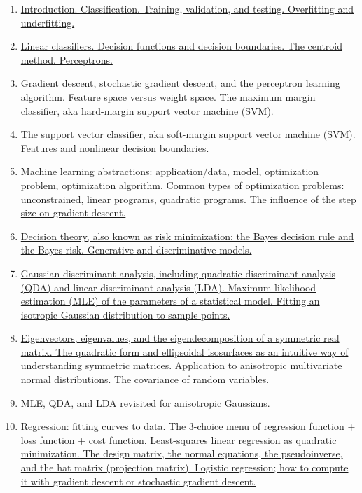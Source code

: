 \documentclass[11pt]{article}
\begin{document}
\begin{enumerate}
	\item  \href{https://mp.weixin.qq.com/s/zLZz3cpvmCjDR2PdJ2qb_g}{Introduction. Classification. Training, validation, and testing. Overfitting and underfitting.} %
	\item  \href{https://mp.weixin.qq.com/s/SGqzoJ22wzwbLHpHSFGSFg}{Linear classifiers. Decision functions and decision boundaries. The centroid method. Perceptrons.} %
	\item  \href{https://mp.weixin.qq.com/s/aFAN-kjJ2YDEHtxrZxP_3g}{Gradient descent, stochastic gradient descent, and the perceptron learning algorithm. Feature space versus weight space. The maximum margin classifier, aka hard-margin support vector machine (SVM).} %
	\item  \href{https://mp.weixin.qq.com/s/a7besi4VC38vRdHASzDtMQ}{The support vector classifier, aka soft-margin support vector machine (SVM). Features and nonlinear decision boundaries.} %
	\item  \href{https://mp.weixin.qq.com/s/EVWSECLifCrTRuo2PwJpxg}{Machine learning abstractions: application/data, model, optimization problem, optimization algorithm. Common types of optimization problems: unconstrained, linear programs, quadratic programs. The influence of the step size on gradient descent.} %
	\item  \href{https://mp.weixin.qq.com/s/RWuGUKQGb7XOVRhLGPobLA}{Decision theory, also known as risk minimization: the Bayes decision rule and the Bayes risk. Generative and discriminative models.} %
	\item  \href{https://mp.weixin.qq.com/s/zi6zvmfnoiLEw0qBEr_Omg}{Gaussian discriminant analysis, including quadratic discriminant analysis (QDA) and linear discriminant analysis (LDA). Maximum likelihood estimation (MLE) of the parameters of a statistical model. Fitting an isotropic Gaussian distribution to sample points.} %
	\item  \href{https://mp.weixin.qq.com/s/itd9chjSjtMfRzDuc_uKvA}{Eigenvectors, eigenvalues, and the eigendecomposition of a symmetric real matrix. The quadratic form and ellipsoidal isosurfaces as an intuitive way of understanding symmetric matrices. Application to anisotropic multivariate normal distributions. The covariance of random variables.} %
	\item  \href{https://mp.weixin.qq.com/s/SSjJQtt7FR7h0JBINyp1zA}{MLE, QDA, and LDA revisited for anisotropic Gaussians.} %
	\item  \href{https://mp.weixin.qq.com/s/A1pVIIu3EWW8Spr6LYO_Jw}{Regression: fitting curves to data. The 3-choice menu of regression function + loss function + cost function. Least-squares linear regression as quadratic minimization. The design matrix, the normal equations, the pseudoinverse, and the hat matrix (projection matrix). Logistic regression; how to compute it with gradient descent or stochastic gradient descent.} %

\end{enumerate}
\end{document}
